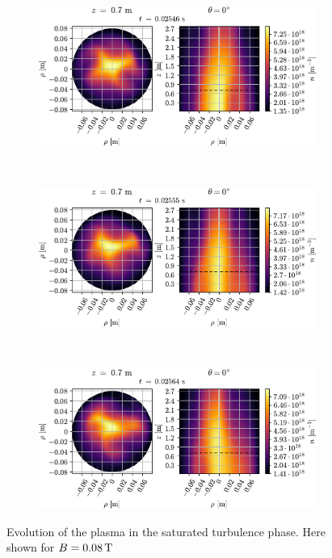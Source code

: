 {
\begin{figure}[htbp]
    \centering
    \begin{subfigure}[h]{1.00\textwidth}
        \centering
        \includegraphics[width=1.0\textwidth]{fig/results/evolution/n-perpPar-2D-0}
    \end{subfigure}%
    \\
    \begin{subfigure}[h]{1.00\textwidth}
        \centering
        \includegraphics[width=1.0\textwidth]{fig/results/evolution/n-perpPar-2D-1}
    \end{subfigure}
    \\
    \begin{subfigure}[h]{1.00\textwidth}
        \centering
        \includegraphics[width=1.0\textwidth]{fig/results/evolution/n-perpPar-2D-2}
    \end{subfigure}
    \caption{Evolution of the plasma in the saturated turbulence phase.
        Here shown for $B=0.08\, \text{T}$}
    \label{fig:turbEv}
\end{figure}
}
%

